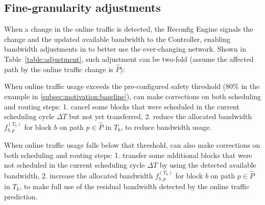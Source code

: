 {\subsection{Fine-granularity adjustments}
\label{subsec:dynamic:incremental}
When a change in the online traffic is detected, the Reconfig Engine signals the change and the updated available bandwidth to the Controller, enabling bandwidth adjustments in \newname to better use the ever-changing network. Shown in Table~\ref{table:adjustment}, such adjustment can be two-fold (assume the affected path by the online traffic change is $\hat{P}$):

\begin{table}[t]
\begin{center}
\end{center}
\label{table:adjustment}
\vspace{-0.4cm}
\end{table}

\begin{packeditemize}
\item When online traffic usage exceeds the pre-configured safety threshold (80\% in the example in \Section\ref{subsec:motivation:baseline}), \newname can make corrections on both scheduling and routing steps: 1. cancel some blocks that were scheduled in the current scheduling cycle $\Delta T$ but not yet transferred, 2. reduce the allocated bandwidth $f_{b,p}^{(T_k)}$ for block $b$ on path $p\in \hat{P}$ in $T_k$, to reduce bandwidth usage.

\item When online traffic usage falls below that threshold, \newname can also make corrections on both scheduling and routing steps: 1. transfer some additional blocks that were not scheduled in the current scheduling cycle $\Delta T$ by using the detected available bandwidth, 2. increase the allocated bandwidth $f_{b,p}^{(T_k)}$ for block $b$ on path $p\in \hat{P}$ in $T_k$, to make full use of the residual bandwidth detected by the online traffic prediction.
\end{packeditemize}

}
